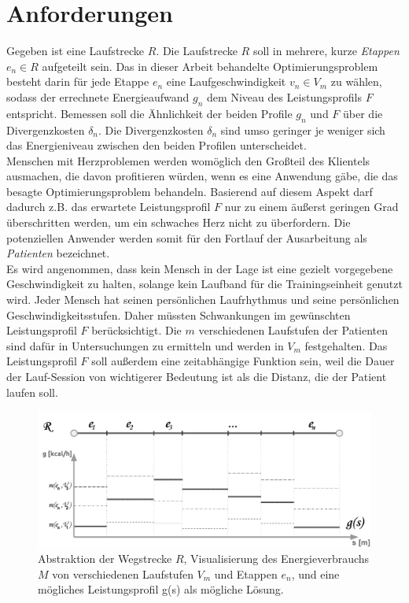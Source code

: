 \documentclass[12pt]{article}
\begin{document}
\section{Anforderungen}\label{afford}
Gegeben ist eine Laufstrecke $R$. Die Laufstrecke $R$ soll in mehrere, kurze \textit{Etappen} $e_{n} \in R$ aufgeteilt sein. Das in dieser Arbeit behandelte Optimierungsproblem besteht darin für jede Etappe $e_{n}$ eine Laufgeschwindigkeit $v_{n} \in V_{m}$ zu wählen, sodass der errechnete Energieaufwand $g_{n}$ dem Niveau des Leistungsprofils $F$ entspricht. Bemessen soll die Ähnlichkeit der beiden Profile $g_{n}$ und $F$ über die Divergenzkosten $\delta_{n}$. Die Divergenzkosten $\delta_{n}$ sind umso geringer je weniger sich das Energieniveau zwischen den beiden Profilen unterscheidet. \\
Menschen mit Herzproblemen werden womöglich den Großteil des Klientels ausmachen, die davon profitieren würden, wenn es eine Anwendung gäbe, die das besagte Optimierungsproblem behandeln. Basierend auf diesem Aspekt darf dadurch z.B. das erwartete Leistungsprofil $F$ nur zu einem äußerst geringen Grad überschritten werden, um ein schwaches Herz nicht zu überfordern. Die potenziellen Anwender werden somit für den Fortlauf der Ausarbeitung als \textit{Patienten} bezeichnet.\\
Es wird angenommen, dass kein Mensch in der Lage ist eine gezielt vorgegebene Geschwindigkeit zu halten, solange kein Laufband für die Trainingseinheit genutzt wird. Jeder Mensch hat seinen persönlichen Laufrhythmus und seine persönlichen Geschwindigkeitsstufen. Daher müssten Schwankungen im gewünschten Leistungsprofil $F$ berücksichtigt. Die $m$ verschiedenen Laufstufen der Patienten sind dafür in Untersuchungen zu ermitteln und werden in $V_{m}$ festgehalten. Das Leistungsprofil $F$ soll außerdem eine zeitabhängige Funktion sein, weil die Dauer der Lauf-Session von wichtigerer Bedeutung ist als die Distanz, die der Patient laufen soll.\\
\begin{figure}[ht]
	\begin{center}
	\includegraphics[width=\textwidth]{pics/pdf/001_Power_on_Way.pdf}
	\caption{Abstraktion der Wegstrecke $R$, Visualisierung des Energieverbrauchs $M$ von verschiedenen Laufstufen $V_{m}$ und Etappen $e_n$, und eine mögliches Leistungsprofil g(s) als mögliche Lösung.}
	\label{pic:power_on_way}
	\end{center}
\end{figure}
\end{document}
